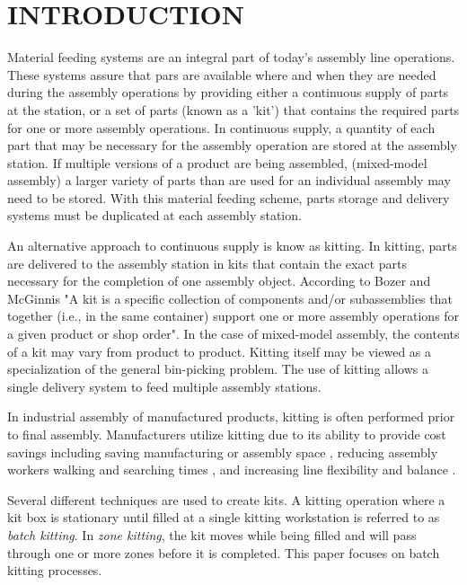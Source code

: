 \section{INTRODUCTION}
Material feeding systems are an integral part of today's assembly line operations. These systems assure that pars are available where and when 
they are needed during the assembly operations by providing either a continuous supply of parts at the station, or a set of parts (known
as a 'kit') that contains the required parts for one or more assembly operations. In continuous supply, a quantity of each part that
may be necessary for the assembly operation are stored at the assembly station. If multiple versions of a product are being assembled,
(mixed-model assembly)
a larger variety of parts than are used for an individual assembly may need to be stored. With this material feeding scheme, parts
storage and delivery systems must be duplicated at each assembly station.

An alternative approach to continuous supply is know as kitting. In kitting, parts are delivered to the assembly station in kits that contain
the exact parts necessary for the completion of one assembly object. According to Bozer and McGinnis \cite{Bozer1992} "A kit is a specific
collection of components and/or subassemblies that together
(i.e., in the same container) support one or more assembly operations for a given product or shop order". In the case of mixed-model
assembly, the contents of a kit may vary from product to product.
Kitting itself may be viewed as a specialization of the general bin-picking problem. The use of kitting allows a single delivery system to feed
multiple assembly stations.

In industrial assembly of manufactured products, kitting is often performed prior to final assembly. Manufacturers utilize kitting
due to its ability to provide cost savings \cite{Carlsson_2008} including saving manufacturing or assembly space \cite{Medbo2003}, reducing assembly workers walking and searching times \cite{Schwind1992}, and increasing line flexibility \cite{Bozer1992} and balance \cite{Jiao2000}.

Several different techniques are used to create kits. A kitting operation where a kit box is stationary until filled at a single
kitting workstation is referred to as {\it batch kitting}. In {\it zone kitting}, the kit moves while being filled and will pass through one or
more zones before it is completed. This paper focuses on batch kitting processes.

